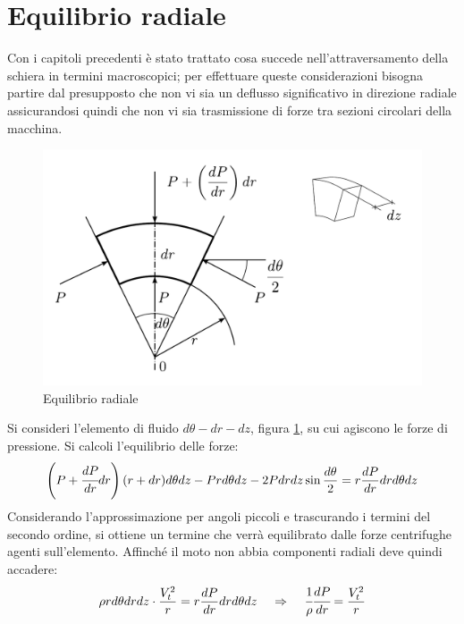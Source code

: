 \section{Equilibrio radiale}
Con i capitoli precedenti è stato trattato cosa succede nell'attraversamento della schiera in termini macroscopici; per effettuare queste considerazioni bisogna partire dal presupposto che non vi sia un deflusso significativo in direzione radiale assicurandosi quindi che non vi sia trasmissione di forze tra sezioni circolari della macchina.
\begin{figure}[h!]
	\centering
	\includegraphics[width=.6\textwidth]{fig/concio.pdf}
	\caption{Equilibrio radiale}
	\label{fig:concio}
\end{figure}

Si consideri l'elemento di fluido $d\theta - dr - dz$, figura \ref{fig:concio}, su cui agiscono le forze di pressione. Si calcoli l'equilibrio delle forze:
\begin{align*}
\left( P + \cfrac{dP}{dr} dr \right) (r + dr) d \theta dz - Pr d \theta dz -2P dr dz \sin \frac{d \theta}{2} = r \frac{dP}{dr} dr d \theta dz
\end{align*}
Considerando l'approssimazione per angoli piccoli e trascurando i termini del secondo ordine, si ottiene un termine che verrà equilibrato dalle forze centrifughe agenti sull'elemento. Affinché il moto non abbia componenti radiali deve quindi accadere:
\begin{equation}
\rho r d \theta dr dz \cdot \frac{V_t^2}{r} = r \frac{dP}{dr} dr d \theta dz \;\;\;\; \Rightarrow \;\;\;\; \cfrac{1}{\rho} \cfrac{dP}{dr} = \frac{V_t^2}{r}
\label{eq:EquilibrioRad}
\end{equation}

